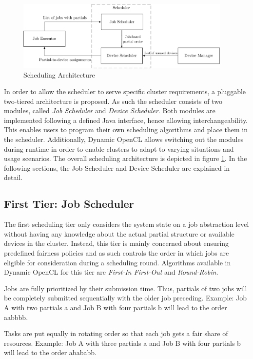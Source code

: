 \begin{figure}[!htb]
	\includegraphics[width=0.95\textwidth]{drawings/scheduling_arch.pdf}
	\centering
	\caption{Scheduling Architecture}
	\label{img:scheduling_arch}
\end{figure}

In order to allow the scheduler to serve specific cluster requirements, a pluggable two-tiered architecture is proposed. As such the scheduler consists of two modules, called \textit{Job Scheduler} and \textit{Device Scheduler}. Both modules are implemented following a defined Java interface, hence allowing interchangeability. This enables users to program their own scheduling algorithms and place them in the scheduler. Additionally, Dynamic OpenCL allows switching out the modules during runtime in order to enable clusters to adapt to varying situations and usage scenarios. The overall scheduling architecture is depicted in figure \ref{img:scheduling_arch}. In the following sections, the Job Scheduler and Device Scheduler are explained in detail.

\subsection{First Tier: Job Scheduler}
The first scheduling tier only considers the system state on a job abstraction level without having any knowledge about the actual partial structure or available devices in the cluster. Instead, this tier is mainly concerned about ensuring predefined fairness policies and as such controls the order in which jobs are eligible for consideration during a scheduling round. Algorithms available in Dynamic OpenCL for this tier are \textit{First-In First-Out} and \textit{Round-Robin}.

\begin{description}[style=nextline]
	\item[First-In First-Out]
	Jobs are fully prioritized by their submission time. Thus, partials of two jobs will be completely submitted sequentially with the older job preceding. Example: Job A with two partials a and Job B with four partials b will lead to the order aabbbb.
	\item[Round-Robin]
	Tasks are put equally in rotating order so that each job gets a fair share of resources. Example: Job A with three partials a and Job B with four partials b will lead to the order abababb.
\end{description}

